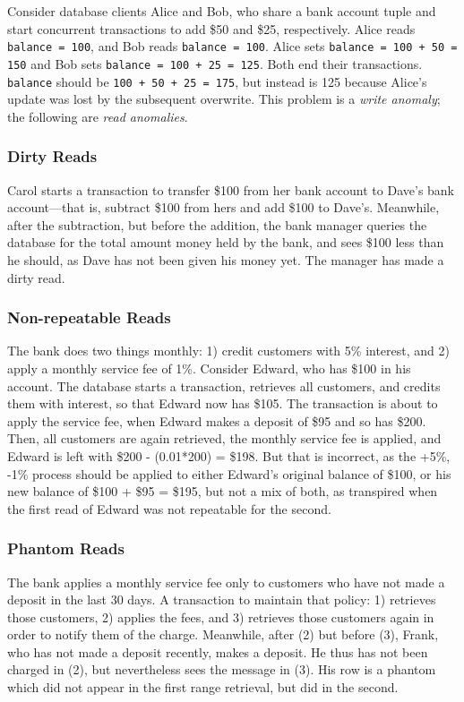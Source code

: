 \documentclass[12pt]{article} %
\begin{document}
Consider database clients Alice and Bob, who share a bank account tuple and start concurrent transactions to add \$50 and \$25, respectively. Alice reads \texttt{balance = 100}, and Bob reads \texttt{balance = 100}. Alice sets \texttt{balance = 100 + 50 = 150} and Bob sets \texttt{balance = 100 + 25 = 125}. Both end their transactions. \texttt{balance} should be \texttt{100 + 50 + 25 = 175}, but instead is 125 because Alice's update was lost by the subsequent overwrite. This problem is a \textit{write anomaly}; the following are \textit{read anomalies}.

\subsubsection{Dirty Reads}
Carol starts a transaction to transfer \$100 from her bank account to Dave's bank account---that is, subtract \$100 from hers and add \$100 to Dave's. Meanwhile, after the subtraction, but before the addition, the bank manager queries the database for the total amount money held by the bank, and sees \$100 less than he should, as Dave has not been given his money yet. The manager has made a dirty read.

\subsubsection{Non-repeatable Reads}
The bank does two things monthly: 1) credit customers with 5\% interest, and 2) apply a monthly service fee of 1\%. Consider Edward, who has \$100 in his account. The database starts a transaction, retrieves all customers, and credits them with interest, so that Edward now has \$105. The transaction is about to apply the service fee, when Edward makes a deposit of \$95 and so has \$200. Then, all customers are again retrieved, the monthly service fee is applied, and Edward is left with \$200 - (0.01*200) = \$198. But that is incorrect, as the +5\%, -1\% process should be applied to either Edward's original balance of \$100, or his new balance of \$100 + \$95 = \$195, but not a mix of both, as transpired when the first read of Edward was not repeatable for the second.

\subsubsection{Phantom Reads}
The bank applies a monthly service fee only to customers who have not made a deposit in the last 30 days. A transaction to maintain that policy: 1) retrieves those customers, 2) applies the fees, and 3) retrieves those customers again in order to notify them of the charge. Meanwhile, after (2) but before (3), Frank, who has not made a deposit recently, makes a deposit. He thus has not been charged in (2), but nevertheless sees the message in (3). His row is a phantom which did not appear in the first range retrieval, but did in the second.
\end{document}
